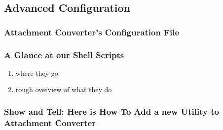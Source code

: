 \documentclass[11pt]{article}
\begin{document}
\subsection{Advanced Configuration}
\label{sec:org31475b9}

\subsubsection{Attachment Converter's Configuration File}
\label{sec:org00190c3}

\subsubsection{A Glance at our Shell Scripts}
\label{sec:org22ec409}

\begin{enumerate}
\item where they go
\label{sec:orgbdd8f69}

\item rough overview of what they do
\label{sec:org50c0389}
\end{enumerate}

\subsubsection{Show and Tell: Here is How To Add a new Utility to Attachment Converter}
\label{sec:org98e152e}
\end{document}
